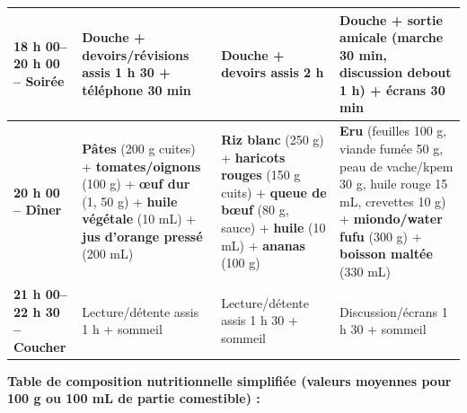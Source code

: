 \documentclass[11pt]{article}
\begin{document}
\begin{center}
\begin{tabularx}{\linewidth}{|l|X|X|X|}
\textbf{18 h 00--20 h 00 -- Soirée} & Douche + \textbf{devoirs/révisions} assis 1 h 30 + \textbf{téléphone} 30 min & Douche + \textbf{devoirs} assis 2 h & Douche + \textbf{sortie amicale} (marche 30 min, discussion debout 1 h) + \textbf{écrans} 30 min \\ \hline
\textbf{20 h 00 -- Dîner} & \textbf{Pâtes} (200 g cuites) + \textbf{tomates/oignons} (100 g) + \textbf{œuf dur} (1, 50 g) + \textbf{huile végétale} (10 mL) + \textbf{jus d'orange pressé} (200 mL) & \textbf{Riz blanc} (250 g) + \textbf{haricots rouges} (150 g cuits) + \textbf{queue de bœuf} (80 g, sauce) + \textbf{huile} (10 mL) + \textbf{ananas} (100 g) & \textbf{Eru} (feuilles 100 g, viande fumée 50 g, peau de vache/kpem 30 g, huile rouge 15 mL, crevettes 10 g) + \textbf{miondo/water fufu} (300 g) + \textbf{boisson maltée} (330 mL) \\ \hline
\textbf{21 h 00--22 h 30 -- Coucher} & Lecture/détente assis 1 h + sommeil & Lecture/détente assis 1 h 30 + sommeil & Discussion/écrans 1 h 30 + sommeil \\ \hline
\end{tabularx}
\end{center}

\par
\textbf{Table de composition nutritionnelle simplifiée (valeurs moyennes pour 100 g ou 100 mL de partie comestible) :}
\end{document}
